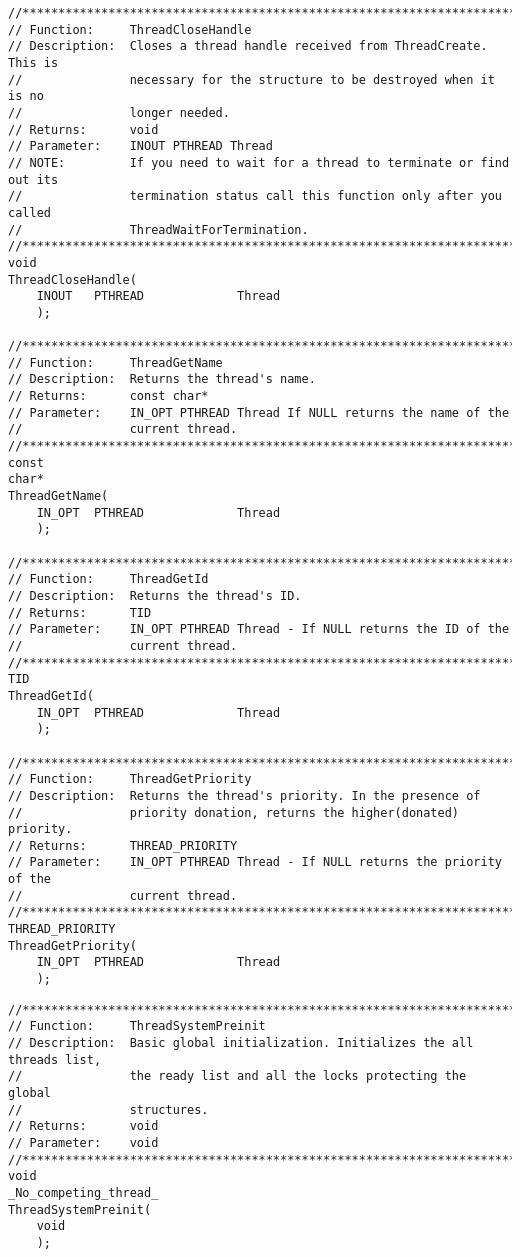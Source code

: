 \begin{appendices}
\begin{lstlisting}[caption={Thread Public Interface},label={lst:ThPublicFuncs}]
//******************************************************************************
// Function:     ThreadCloseHandle
// Description:  Closes a thread handle received from ThreadCreate. This is
//               necessary for the structure to be destroyed when it is no
//               longer needed.
// Returns:      void
// Parameter:    INOUT PTHREAD Thread
// NOTE:         If you need to wait for a thread to terminate or find out its
//               termination status call this function only after you called
//               ThreadWaitForTermination.
//******************************************************************************
void
ThreadCloseHandle(
    INOUT   PTHREAD             Thread
    );

//******************************************************************************
// Function:     ThreadGetName
// Description:  Returns the thread's name.
// Returns:      const char*
// Parameter:    IN_OPT PTHREAD Thread If NULL returns the name of the
//               current thread.
//******************************************************************************
const
char*
ThreadGetName(
    IN_OPT  PTHREAD             Thread
    );

//******************************************************************************
// Function:     ThreadGetId
// Description:  Returns the thread's ID.
// Returns:      TID
// Parameter:    IN_OPT PTHREAD Thread - If NULL returns the ID of the
//               current thread.
//******************************************************************************
TID
ThreadGetId(
    IN_OPT  PTHREAD             Thread
    );

//******************************************************************************
// Function:     ThreadGetPriority
// Description:  Returns the thread's priority. In the presence of
//               priority donation, returns the higher(donated) priority.
// Returns:      THREAD_PRIORITY
// Parameter:    IN_OPT PTHREAD Thread - If NULL returns the priority of the
//               current thread.
//******************************************************************************
THREAD_PRIORITY
ThreadGetPriority(
    IN_OPT  PTHREAD             Thread
    );
\end{lstlisting}

\begin{lstlisting}[caption={Thread Private Interface},label={lst:ThPrivateFuncs}]
//******************************************************************************
// Function:     ThreadSystemPreinit
// Description:  Basic global initialization. Initializes the all threads list,
//               the ready list and all the locks protecting the global
//               structures.
// Returns:      void
// Parameter:    void
//******************************************************************************
void
_No_competing_thread_
ThreadSystemPreinit(
    void
    );


\end{lstlisting}
\end{appendices}
